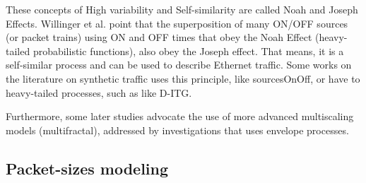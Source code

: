 These concepts of  High variability and Self-similarity are called Noah and Joseph Effects\cite{selfsimilar-highvariability}. Willinger et al. point that the superposition of many ON/OFF sources (or packet trains) using ON and OFF times that obey the Noah Effect (heavy-tailed probabilistic functions), also obey the Joseph effect. That means, it is a self-similar process and can be used to describe Ethernet traffic. Some works on the literature on synthetic traffic uses this principle, like sourcesOnOff\cite{sourcesonoff-paper}, or have to heavy-tailed processes, such as like D-ITG.

Furthermore, some later studies advocate the use of more advanced multiscaling models (multifractal), addressed by investigations that uses envelope processes\cite{envelope-process}. 


\subsection{Packet-sizes modeling}


